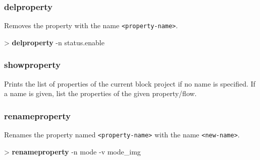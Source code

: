\documentclass[10pt,a4paper]{article}
\begin{document}
{

\subsubsection{delproperty}
\label{subsec:delproperty}

Removes the property with the name \texttt{<property-name>}.\\


\begin{sampletitle}
> \textbf{\tool{} delproperty} -n status.enable
\end{sampletitle}


\subsubsection{showproperty}
\label{subsec:showproperty}

Prints the list of properties of the current block project if no name is specified. If a name is given, list the properties of the given property/flow.

\subsubsection{renameproperty}
\label{subsec:renameproperty}

Renames the property named \texttt{<property-name>} with the name \texttt{<new-name>}.\\


\begin{sampletitle}
> \textbf{\tool{} renameproperty} -n mode -v mode\_img
\end{sampletitle}

}
\end{document}
